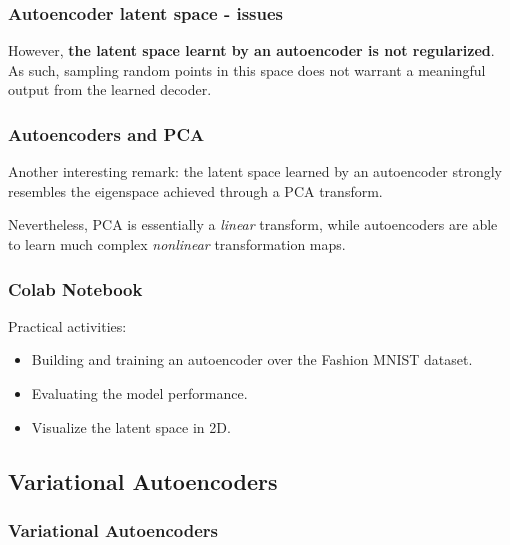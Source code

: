 \begin{frame}
    \frametitle{Autoencoder latent space - issues}
    However, \textbf{the latent space learnt by an autoencoder is not regularized}. As such, sampling random points in this space does not warrant a meaningful output from the learned decoder.
\end{frame}

\begin{frame}
    \frametitle{Autoencoders and PCA}
    Another interesting remark: the latent space learned by an autoencoder strongly resembles the eigenspace achieved through a PCA transform.

    Nevertheless, PCA is essentially a \emph{linear} transform, while autoencoders are able to learn much complex \emph{nonlinear} transformation maps.
\end{frame}

{
\begin{frame}
    \frametitle{Colab Notebook}
    Practical activities:
    \begin{itemize}
        \item Building and training an autoencoder over the Fashion MNIST dataset.
        \item Evaluating the model performance.
        \item Visualize the latent space in 2D.
    \end{itemize}
\end{frame}
}

\subsection{Variational Autoencoders}

\begin{frame}
    \frametitle{Variational Autoencoders}
\end{frame}